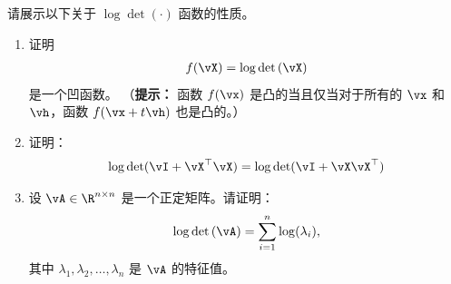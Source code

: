 \documentclass[../../book-main.tex]{subfiles}
\begin{document}
\begin{exercise}
请展示以下关于 $\log\det(\cdot)$ 函数的性质。

\begin{enumerate}
    \item 证明
    \begin{align*}
    f(\vX) = \log\det\left(\vX\right)  
    \end{align*}
    是一个凹函数。 （{\bf 提示：} 函数 $f(\vx)$ 是凸的当且仅当对于所有的 $\vx$ 和 $\vh$，函数 $f(\vx+t\vh)$ 也是凸的。）

\item 证明：
    \begin{align*}
        \log\det(\vI + \vX^\top\vX) = \log\det(\vI + \vX\vX^\top)
    \end{align*}

\item 设 $\vA \in \R^{n\times n}$ 是一个正定矩阵。请证明：
\begin{align}
\log\det\left(\vA \right) = \sum_{i=1}^n \log(\lambda_i),
\end{align}
其中 $\lambda_1,\lambda_2,\dots,\lambda_n$ 是 $\vA$ 的特征值。
\end{enumerate}
    
\end{exercise}

\begin{exercise}
\end{exercise}

\begin{exercise}
\end{exercise}
\end{document}
